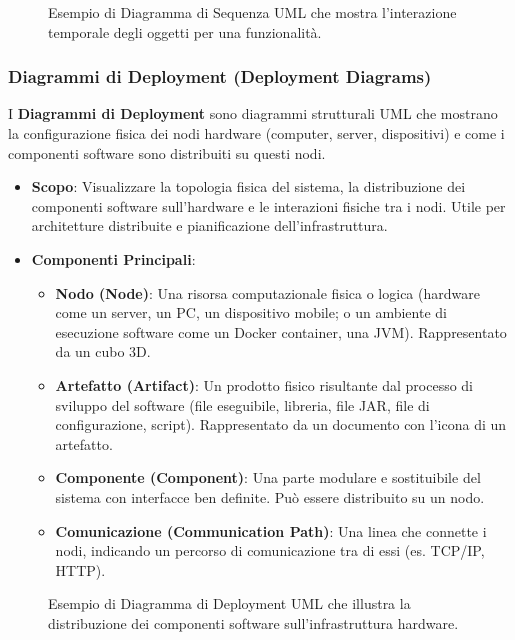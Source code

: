 \begin{figure}[h!]
    \centering
    \caption{Esempio di Diagramma di Sequenza UML che mostra l'interazione temporale degli oggetti per una funzionalità.}
    \label{fig:diagramma_sequenza_uml_specifico}
\end{figure}

\subsubsection{Diagrammi di Deployment (Deployment Diagrams)}
I \textbf{Diagrammi di Deployment} sono diagrammi strutturali UML che mostrano la configurazione fisica dei nodi hardware (computer, server, dispositivi) e come i componenti software sono distribuiti su questi nodi.
\begin{itemize}
    \item \textbf{Scopo}: Visualizzare la topologia fisica del sistema, la distribuzione dei componenti software sull'hardware e le interazioni fisiche tra i nodi. Utile per architetture distribuite e pianificazione dell'infrastruttura.
    \item \textbf{Componenti Principali}:
    \begin{itemize}
        \item \textbf{Nodo (Node)}: Una risorsa computazionale fisica o logica (hardware come un server, un PC, un dispositivo mobile; o un ambiente di esecuzione software come un Docker container, una JVM). Rappresentato da un cubo 3D.
        \item \textbf{Artefatto (Artifact)}: Un prodotto fisico risultante dal processo di sviluppo del software (file eseguibile, libreria, file JAR, file di configurazione, script). Rappresentato da un documento con l'icona di un artefatto.
        \item \textbf{Componente (Component)}: Una parte modulare e sostituibile del sistema con interfacce ben definite. Può essere distribuito su un nodo.
        \item \textbf{Comunicazione (Communication Path)}: Una linea che connette i nodi, indicando un percorso di comunicazione tra di essi (es. TCP/IP, HTTP).
    \end{itemize}
\end{itemize}
\begin{figure}[h!]
    \centering
    \caption{Esempio di Diagramma di Deployment UML che illustra la distribuzione dei componenti software sull'infrastruttura hardware.}
    \label{fig:diagramma_deployment_uml}
\end{figure}